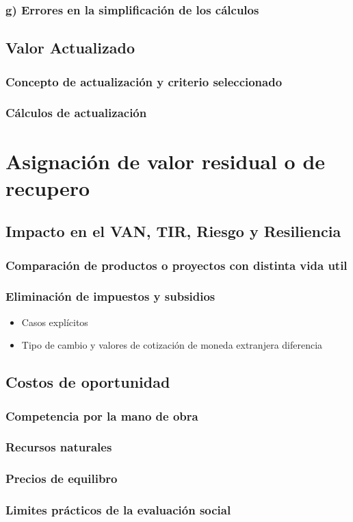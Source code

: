 \documentclass[crop=false]{standalone}
\begin{document}
\subsubsection{g) Errores en la simplificación de los cálculos}

 \subsection{Valor Actualizado}
\subsubsection{ Concepto de actualización y criterio seleccionado}
\subsubsection{ Cálculos de actualización }


\section{Asignación de valor residual o de recupero}

\subsection{Impacto en el VAN, TIR, Riesgo y Resiliencia }

\subsubsection{Comparación de productos o proyectos con distinta vida util}

\subsubsection{Eliminación de impuestos y subsidios}

\begin{itemize}
    \item Casos explícitos
    \item Tipo de cambio y valores de cotización de moneda extranjera diferencia

    
\end{itemize}

\subsection{Costos de oportunidad}

\subsubsection{Competencia por la mano de obra}
\subsubsection{Recursos naturales}
\subsubsection{Precios de equilibro}
\subsubsection{Limites prácticos de la evaluación social}



\end{document}

